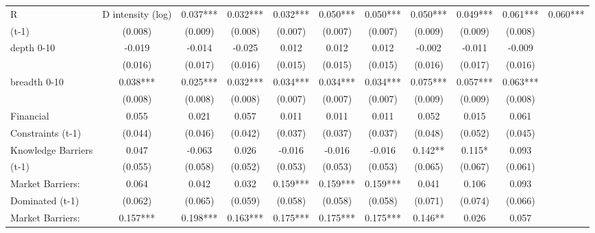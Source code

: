 \begin{table}[htbp]
\begin{tabular}{l*{9}{c}}
R&D intensity (log) &       0.037***&       0.032***&       0.032***&       0.050***&       0.050***&       0.050***&       0.049***&       0.061***&       0.060***\\
(t-1)               &     (0.008)   &     (0.009)   &     (0.008)   &     (0.007)   &     (0.007)   &     (0.007)   &     (0.009)   &     (0.009)   &     (0.008)   \\
depth 0-10          &      -0.019   &      -0.014   &      -0.025   &       0.012   &       0.012   &       0.012   &      -0.002   &      -0.011   &      -0.009   \\
                    &     (0.016)   &     (0.017)   &     (0.016)   &     (0.015)   &     (0.015)   &     (0.015)   &     (0.016)   &     (0.017)   &     (0.016)   \\
breadth 0-10        &       0.038***&       0.025***&       0.032***&       0.034***&       0.034***&       0.034***&       0.075***&       0.057***&       0.063***\\
                    &     (0.008)   &     (0.008)   &     (0.008)   &     (0.007)   &     (0.007)   &     (0.007)   &     (0.009)   &     (0.009)   &     (0.008)   \\
Financial           &       0.055   &       0.021   &       0.057   &       0.011   &       0.011   &       0.011   &       0.052   &       0.015   &       0.061   \\
Constraints (t-1)   &     (0.044)   &     (0.046)   &     (0.042)   &     (0.037)   &     (0.037)   &     (0.037)   &     (0.048)   &     (0.052)   &     (0.045)   \\
Knowledge Barriers  &       0.047   &      -0.063   &       0.026   &      -0.016   &      -0.016   &      -0.016   &       0.142** &       0.115*  &       0.093   \\
(t-1)               &     (0.055)   &     (0.058)   &     (0.052)   &     (0.053)   &     (0.053)   &     (0.053)   &     (0.065)   &     (0.067)   &     (0.061)   \\
Market Barriers:    &       0.064   &       0.042   &       0.032   &       0.159***&       0.159***&       0.159***&       0.041   &       0.106   &       0.093   \\
Dominated (t-1)     &     (0.062)   &     (0.065)   &     (0.059)   &     (0.058)   &     (0.058)   &     (0.058)   &     (0.071)   &     (0.074)   &     (0.066)   \\
Market Barriers:    &       0.157***&       0.198***&       0.163***&       0.175***&       0.175***&       0.175***&       0.146** &       0.026   &       0.057   \\

\end{tabular}
\end{table}
